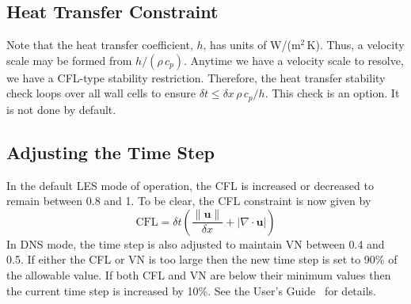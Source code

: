 \subsection{Heat Transfer Constraint}

Note that the heat transfer coefficient, $h$, has units of W/(m$^2$\,K).  Thus, a velocity scale may be formed from $h/(\rho\, c_p)$.  Anytime we have a velocity scale to resolve, we have a CFL-type stability restriction.  Therefore, the heat transfer stability check loops over all wall cells to ensure $\delta t \le \delta x \,\rho \,c_p/h$.  This check is an option. It is not done by default.

\subsection{Adjusting the Time Step}

In the default LES mode of operation, the CFL is increased or decreased to remain between 0.8 and 1.  To be clear, the CFL constraint is now given by
\begin{equation}
\mbox{CFL} = \delta t \left( \frac{\|\mathbf{u}\|}{\delta x} + |\nabla\cdot\mathbf{u}| \right)
\end{equation}
In DNS mode, the time step is also adjusted to maintain VN between 0.4 and 0.5. If either the CFL or VN is too large then the new time step is set to 90\% of the allowable value.  If both CFL and VN are below their minimum values then the current time step is increased by 10\%.  See the User's Guide~\cite{FDS_Users_Guide} for details.




